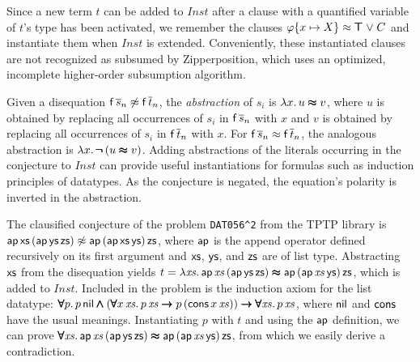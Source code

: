 \documentclass[smallcondensed,draft]{svjour3}     %
\begin{document}
Since a new term $t$ can be added to $\mathit{Inst}$ after a clause with a
quantified variable of $t$'s type has been activated, we 
remember the clauses $\varphi\{x \mapsto X\} \approx \pmb\top\allowbreak \mathrel\lor C$ and instantiate
them when $\mathit{Inst}$ is extended.
Conveniently, these instantiated clauses are not recognized as subsumed by
Zipperposition, which uses an optimized, incomplete higher-order subsumption
algorithm.

Given a disequation $\mathsf{f}\,\overline{s}_{n} \not\approx \mathsf{f}\,\overline{t}_{n}$, the
\emph{abstraction} of $s_i$ is $\lambda x.\, u \pmb\approx v$, where $u$ is obtained by
replacing all occurrences of $s_i$ in $\mathsf{f}\,\overline{s}_{n}$ with $x$ and $v$ is
obtained by replacing all occurrences of $s_i$ in
$\mathsf{f}\,\overline{t}_{n}$ with $x$. For $\mathsf{f}\,\overline{s}_{n} \approx
\mathsf{f}\,\overline{t}_{n}$, the analogous abstraction is $\lambda x.\, \pmb{\neg\,} (u \pmb\approx
v)$.
%
%
Adding abstractions of the literals occurring in the conjecture to $\mathit{Inst}$ can
provide useful instantiations for formulas such as induction principles of
datatypes. As the conjecture is negated,
the equation's polarity is inverted in the
abstraction. 

\begin{examplex}
\label{ex:dat056-2}
The clausified conjecture of the problem \texttt{DAT056\^{}2}
\cite{ns-13-leo2sh} from the TPTP library is $\mathsf{ap} \, \mathsf{xs}
\, (\mathsf{ap} \, \mathsf{ys} \, \mathsf{zs}) \not\approx \mathsf{ap} \, (\mathsf{ap} \, \mathsf{xs} \,
\mathsf{ys}) \, \mathsf{zs}$, where $\mathsf{ap}$ is the append operator defined
recursively on its first argument and $\mathsf{xs}$, $\mathsf{ys}$, and $\mathsf{zs}$ are
of list type. Abstracting $\mathsf{xs}$ from the disequation yields $t = \lambda \mathit{xs}.\, \mathsf{ap} \, \mathit{xs} \, (\mathsf{ap} \, \mathsf{ys} \, \mathsf{zs})
\allowbreak\pmb\approx\allowbreak \mathsf{ap} \, (\mathsf{ap} \, \mathit{xs} \, \mathsf{ys}) \, \mathsf{zs}$, which is added
to $\mathit{Inst}$.
Included in the problem is the induction axiom
for the list datatype: $\pmb\forall p. \, p \, \mathsf{nil} \pmb\land (\pmb\forall x \,
\mathit{xs}. \, p \, \mathit{xs} \pmb\rightarrow\allowbreak p \, (\mathsf{cons} \, x \,
\mathit{xs})) \pmb\rightarrow\allowbreak \pmb\forall \mathit{xs}. \, p \, \mathit{xs}$, where
$\mathsf{nil}$ and $\mathsf{cons}$ have the usual meanings.
Instantiating $p$ with $t$ and
using the $\mathsf{ap}$ definition, we can prove
$\pmb\forall \mathit{xs}. \, \mathsf{ap} \, \mathit{xs} \, (\mathsf{ap} \, \mathsf{ys} \, \mathsf{zs})
\pmb\approx \mathsf{ap} \, (\mathsf{ap} \, \mathit{xs} \, \mathsf{ys}) \, \mathsf{zs}$,
from which we easily derive a contradiction.
\end{examplex}
\end{document}
